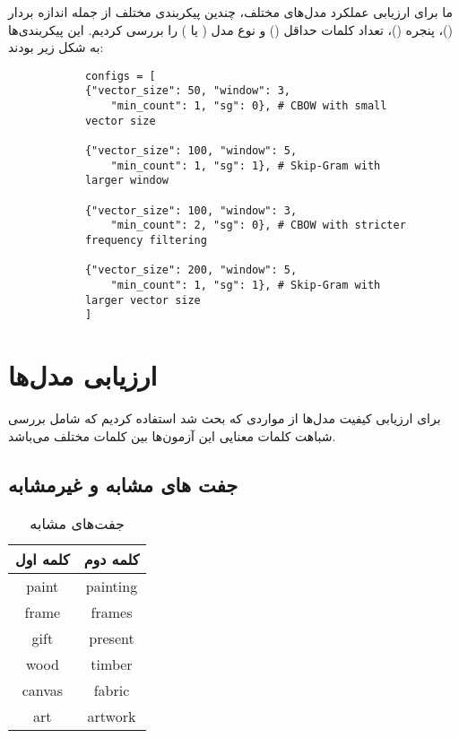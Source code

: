 \documentclass[a4paper,12pt]{article}
\begin{document}
	ما برای ارزیابی عملکرد مدل‌های مختلف، چندین پیکربندی مختلف از جمله اندازه 
	بردار 
	()، پنجره ()، تعداد کلمات حداقل () 
	و 
	نوع مدل ( یا ) را بررسی کردیم. این پیکربندی‌ها به شکل زیر 
	بودند:
	
	\pagebreak
	
	\begin{latin}
		\begin{verbatim}
			configs = [
			{"vector_size": 50, "window": 3,
				"min_count": 1, "sg": 0}, # CBOW with small
			vector size
			
			{"vector_size": 100, "window": 5,
				"min_count": 1, "sg": 1}, # Skip-Gram with
			larger window
			
			{"vector_size": 100, "window": 3,
				"min_count": 2, "sg": 0}, # CBOW with stricter
			frequency filtering
			
			{"vector_size": 200, "window": 5,
				"min_count": 1, "sg": 1}, # Skip-Gram with
			larger vector size
			]
		\end{verbatim}
	\end{latin}
	
	\section*{ارزیابی مدل‌ها}
	
	برای ارزیابی کیفیت مدل‌ها از مواردی که بحث شد استفاده کردیم که شامل بررسی 
	شباهت کلمات معنایی این آزمون‌ها بین کلمات مختلف می‌باشد. 
	
	\subsection*{جفت ‌های مشابه و غیرمشابه}
	
	\begin{table}[h]
		\centering
		\caption{جفت‌های مشابه}
		\begin{tabular}{|c|c|}
			\hline
			\textbf{کلمه اول} & \textbf{کلمه دوم} \\
			\hline
			paint & painting \\
			\hline
			frame & frames \\
			\hline
			gift & present \\
			\hline
			wood & timber \\
			\hline
			canvas & fabric \\
			\hline
			art & artwork \\
			\hline
		\end{tabular}
	\end{table}
	
\end{document}

